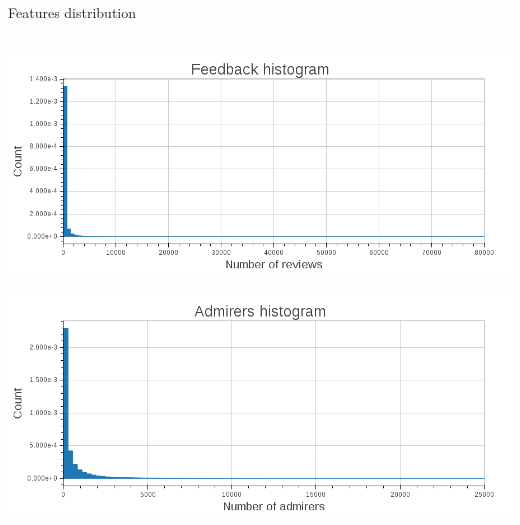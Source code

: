 \begin{frame}[fragile]{Features distribution}
    \begin{columns}
     \begin{column}{.49\textwidth}
        \begin{center}
            \includegraphics[scale=.18]{images/histogram_feedback}
        \end{center}
        \newline{}
        \begin{center}
            \includegraphics[scale=.18]{images/histogram_admirers}
        \end{center}
     \end{column}
    

\end{columns}
\end{frame}
